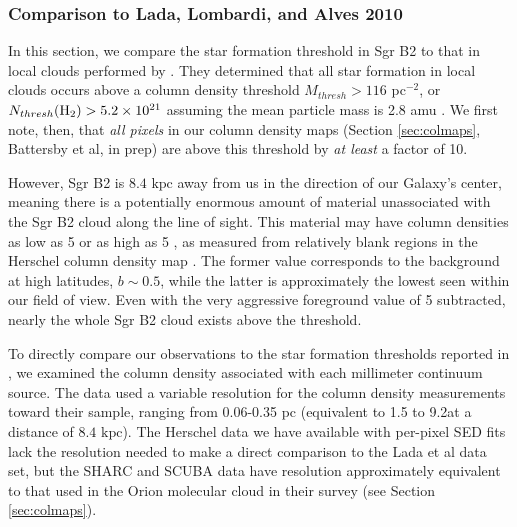 \documentclass[twocolumn]{aastex61}
\newcommand{\dsgrb}{\ensuremath{8.4\textrm{~kpc}}\xspace}
\begin{document}
\subsubsection{Comparison to Lada, Lombardi, and Alves 2010}
\label{sec:ladathreshold}
In this section, we compare the star formation threshold in Sgr B2 to that in
local clouds performed by \citet{Lada2010a}.  They determined that all star
formation in local clouds occurs above a column density threshold $M_{thresh} >
116$ \msun pc$^{-2}$, or $N_{thresh}(\textrm{H}_{2}) > 5.2\times10^{21}$ \persc assuming the
mean particle mass is 2.8 amu \citep{Kauffmann2008a}.  We first note, then,
that \emph{all pixels} in our column density maps (Section \ref{sec:colmaps},
Battersby et al, in prep) are above this threshold by \emph{at least} a factor
of 10.

However, Sgr B2 is \dsgrb away from us in the direction of our Galaxy's
center, meaning there is a potentially enormous amount of material unassociated
with the Sgr B2 cloud along the line of sight.  This material may have column
densities as low as
5 \persc or as high as 5 \persc, as measured from relatively
blank regions in the Herschel column density map \citep[][and in
prep]{Battersby2011a}.  The
former value corresponds to
the background at high latitudes, $b\sim0.5$, while the latter  is
approximately the lowest seen within our field of view. 
Even with the very aggressive foreground value of 5 \persc subtracted,
nearly the whole Sgr B2 cloud exists above the \citet{Lada2010a} threshold.

To directly compare our observations to the star formation thresholds reported
in \citet{Lada2010a}, we examined the column density associated with each
millimeter continuum source.  The \citet{Lada2010a} data used a variable
resolution for the column density measurements toward their sample, ranging from
0.06-0.35 pc (equivalent to 1.5 to 9.2\arcsec at a distance of \dsgrb).  The
Herschel data we have available with per-pixel SED fits lack the resolution
needed to make a direct comparison to the Lada et al data set, but the SHARC
and SCUBA data have resolution approximately equivalent to that used in the
Orion molecular cloud in their survey (see Section \ref{sec:colmaps}).
\end{document}
